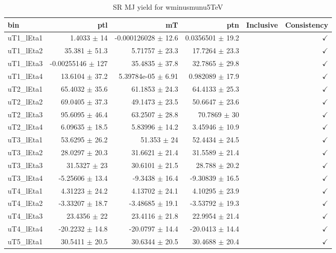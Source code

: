 \begin{table}[htbp]
\centering
\scriptsize
\caption{SR MJ yield for wminusmunu5TeV}
\label{tab:wminusmunu5TeV}
\setlength{\tabcolsep}{6pt}
\begin{tabular}{lrrrrr}
\hline
bin & ptl & mT & ptn & Inclusive & Consistency \\
\hline
uT1\_lEta1 & 1.4033 $\pm$ 14 & -0.000126028 $\pm$ 12.6 & 0.0356501 $\pm$ 19.2 &  & $\checkmark$ \\
uT1\_lEta2 & 35.381 $\pm$ 51.3 & 5.71757 $\pm$ 23.3 & 17.7264 $\pm$ 23.3 &  & $\checkmark$ \\
uT1\_lEta3 & -0.00255146 $\pm$ 127 & 35.4835 $\pm$ 37.8 & 32.7865 $\pm$ 29.8 &  & $\checkmark$ \\
uT1\_lEta4 & 13.6104 $\pm$ 37.2 & 5.39784e-05 $\pm$ 6.91 & 0.982089 $\pm$ 17.9 &  & $\checkmark$ \\
uT2\_lEta1 & 65.4032 $\pm$ 35.6 & 61.1853 $\pm$ 24.3 & 64.4133 $\pm$ 25.3 &  & $\checkmark$ \\
uT2\_lEta2 & 69.0405 $\pm$ 37.3 & 49.1473 $\pm$ 23.5 & 50.6647 $\pm$ 23.6 &  & $\checkmark$ \\
uT2\_lEta3 & 95.6095 $\pm$ 46.4 & 63.2507 $\pm$ 28.8 & 70.7869 $\pm$ 30 &  & $\checkmark$ \\
uT2\_lEta4 & 6.09635 $\pm$ 18.5 & 5.83996 $\pm$ 14.2 & 3.45946 $\pm$ 10.9 &  & $\checkmark$ \\
uT3\_lEta1 & 53.6295 $\pm$ 26.2 & 51.353 $\pm$ 24 & 52.4434 $\pm$ 24.5 &  & $\checkmark$ \\
uT3\_lEta2 & 28.0297 $\pm$ 20.3 & 31.6621 $\pm$ 21.4 & 31.5589 $\pm$ 21.4 &  & $\checkmark$ \\
uT3\_lEta3 & 31.5327 $\pm$ 23 & 30.6101 $\pm$ 21.5 & 28.788 $\pm$ 20.2 &  & $\checkmark$ \\
uT3\_lEta4 & -5.25606 $\pm$ 13.4 & -9.3438 $\pm$ 16.4 & -9.30839 $\pm$ 16.5 &  & $\checkmark$ \\
uT4\_lEta1 & 4.31223 $\pm$ 24.2 & 4.13702 $\pm$ 24.1 & 4.10295 $\pm$ 23.9 &  & $\checkmark$ \\
uT4\_lEta2 & -3.33207 $\pm$ 18.7 & -3.48685 $\pm$ 19.1 & -3.53792 $\pm$ 19.3 &  & $\checkmark$ \\
uT4\_lEta3 & 23.4356 $\pm$ 22 & 23.4116 $\pm$ 21.8 & 22.9954 $\pm$ 21.4 &  & $\checkmark$ \\
uT4\_lEta4 & -20.2232 $\pm$ 14.8 & -20.0797 $\pm$ 14.4 & -20.0413 $\pm$ 14.4 &  & $\checkmark$ \\
uT5\_lEta1 & 30.5411 $\pm$ 20.5 & 30.6344 $\pm$ 20.5 & 30.4688 $\pm$ 20.4 &  & $\checkmark$ \\

\end{tabular}
\end{table}
